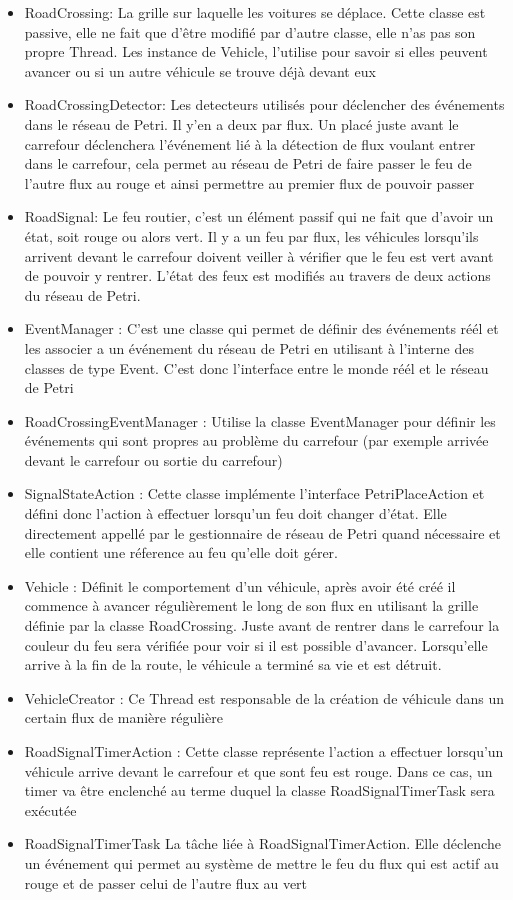 \documentclass[11pt,a4paper, openany]{memoir}
\begin{document}
\begin{itemize}
\item RoadCrossing: La grille sur laquelle les voitures se déplace. Cette classe est passive, elle ne fait que d'être modifié par d'autre classe, elle n'as pas son propre Thread. Les instance de Vehicle, l'utilise pour savoir si elles peuvent avancer ou si un autre véhicule se trouve déjà devant eux
\item RoadCrossingDetector: Les detecteurs utilisés pour déclencher des événements dans le réseau de Petri. Il y'en a deux par flux. Un placé juste avant le carrefour déclenchera l'événement lié à la détection de flux voulant entrer dans le carrefour, cela permet au réseau de Petri de faire passer le feu de l'autre flux au rouge et ainsi permettre au premier flux de pouvoir passer
\item RoadSignal: Le feu routier, c'est un élément passif qui ne fait que d'avoir un état, soit rouge ou alors vert. Il y a un feu par flux, les véhicules lorsqu'ils arrivent devant le carrefour doivent veiller à vérifier que le feu est vert avant de pouvoir y rentrer. L'état des feux est modifiés au travers de deux actions du réseau de Petri.
\item EventManager : C'est une classe qui permet de définir des événements réél et les associer a un événement du réseau de Petri en utilisant à l'interne des classes de type Event. C'est donc l'interface entre le monde réél et le réseau de Petri
\item RoadCrossingEventManager : Utilise la classe EventManager pour définir les événements qui sont propres au problème du carrefour (par exemple arrivée devant le carrefour ou sortie du carrefour)
\item SignalStateAction : Cette classe implémente l'interface PetriPlaceAction et défini donc l'action à effectuer lorsqu'un feu doit changer d'état. Elle directement appellé par le gestionnaire de réseau de Petri quand nécessaire et elle contient une réference au feu qu'elle doit gérer.
\item Vehicle : Définit le comportement d'un véhicule, après avoir été créé il commence à avancer régulièrement le long de son flux en utilisant la grille définie par la classe RoadCrossing. Juste avant de rentrer dans le carrefour la couleur du feu sera vérifiée pour voir si il est possible d'avancer. Lorsqu'elle arrive à la fin de la route, le véhicule a terminé sa vie et est détruit.
\item VehicleCreator : Ce Thread est responsable de la création de véhicule dans un certain flux de manière régulière
\item RoadSignalTimerAction : Cette classe représente l'action a effectuer lorsqu'un véhicule arrive devant le carrefour et que sont feu est rouge. Dans ce cas, un timer va être enclenché au terme duquel la classe RoadSignalTimerTask sera exécutée
\item RoadSignalTimerTask La tâche liée à RoadSignalTimerAction. Elle déclenche un événement qui permet au système de mettre le feu du flux qui est actif au rouge et de passer celui de l'autre flux au vert
\end{itemize}
\end{document}
